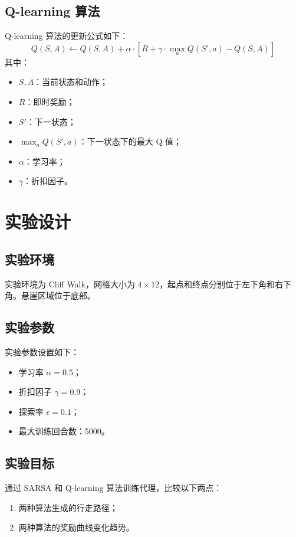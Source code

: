 \documentclass{article}
\begin{document}
\subsection{Q-learning 算法}
Q-learning 算法的更新公式如下：
\[
Q(S, A) \gets Q(S, A) + \alpha \cdot \left[ R + \gamma \cdot \max_a Q(S', a) - Q(S, A) \right]
\]
其中：
\begin{itemize}
    \item $S, A$：当前状态和动作；
    \item $R$：即时奖励；
    \item $S'$：下一状态；
    \item $\max_a Q(S', a)$：下一状态下的最大 Q 值；
    \item $\alpha$：学习率；
    \item $\gamma$：折扣因子。
\end{itemize}

\section{实验设计}
\subsection{实验环境}
实验环境为 Cliff Walk，网格大小为 $4 \times 12$，起点和终点分别位于左下角和右下角。悬崖区域位于底部。

\subsection{实验参数}
实验参数设置如下：
\begin{itemize}
    \item 学习率 $\alpha = 0.5$；
    \item 折扣因子 $\gamma = 0.9$；
    \item 探索率 $\epsilon = 0.1$；
    \item 最大训练回合数：5000。
\end{itemize}

\subsection{实验目标}
通过 SARSA 和 Q-learning 算法训练代理，比较以下两点：
\begin{enumerate}
    \item 两种算法生成的行走路径；
    \item 两种算法的奖励曲线变化趋势。
\end{enumerate}
\end{document}
